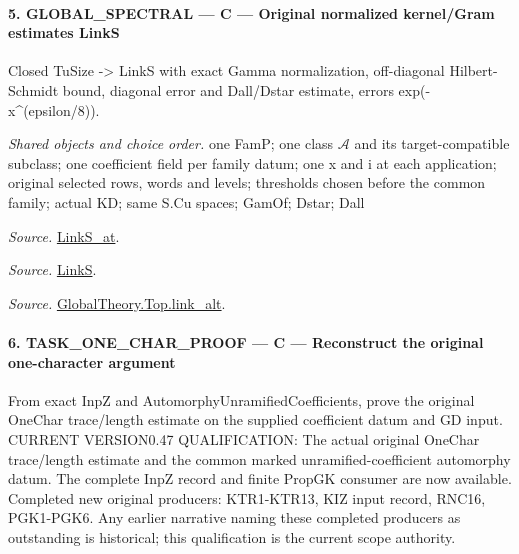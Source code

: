 \paragraph{5. GLOBAL\_\allowbreak SPECTRAL — C — Original normalized kernel/Gram estimates LinkS}

Closed TuSize -> LinkS with exact Gamma normalization, off-diagonal Hilbert-Schmidt bound, diagonal error and Dall/Dstar estimate, errors exp(-x\textasciicircum{}(epsilon/8)).

\emph{Shared objects and choice order.} one FamP; one class $\mathcal A$ and its target-compatible subclass; one coefficient field per family datum; one x and i at each application; original selected rows, words and levels; thresholds chosen before the common family; actual KD; same S.Cu spaces; GamOf; Dstar; Dall

\emph{Source.} \href{https://github.com/CocoSgt/riemann-hypothesis-lean/blob/7cbf7a0c32fca1badf05931879a37c3f8a2b03b4/src/Formalism/SharpRestriction/GlobalTheoremInputs.lean#L145-L149}{LinkS\_\allowbreak at}.

\emph{Source.} \href{https://github.com/CocoSgt/riemann-hypothesis-lean/blob/7cbf7a0c32fca1badf05931879a37c3f8a2b03b4/src/Formalism/SharpRestriction/GlobalTheoremInputs.lean#L152-L157}{LinkS}.

\emph{Source.} \href{https://github.com/CocoSgt/riemann-hypothesis-lean/blob/7cbf7a0c32fca1badf05931879a37c3f8a2b03b4/src/Development/AbelianVarietyTheory/Proofs/GlobalInterpolation/LinkAlt.lean#L16-L50}{GlobalTheory.Top.link\_\allowbreak alt}.



\paragraph{6. TASK\_\allowbreak ONE\_\allowbreak CHAR\_\allowbreak PROOF — C — Reconstruct the original one-character argument}

From exact InpZ and AutomorphyUnramifiedCoefficients, prove the original OneChar trace/length estimate on the supplied coefficient datum and GD input. CURRENT VERSION0.47 QUALIFICATION: The actual original OneChar trace/length estimate and the common marked unramified-coefficient automorphy datum. The complete InpZ record and finite PropGK consumer are now available. Completed new original producers: KTR1-KTR13, KIZ input record, RNC16, PGK1-PGK6. Any earlier narrative naming these completed producers as outstanding is historical; this qualification is the current scope authority.

